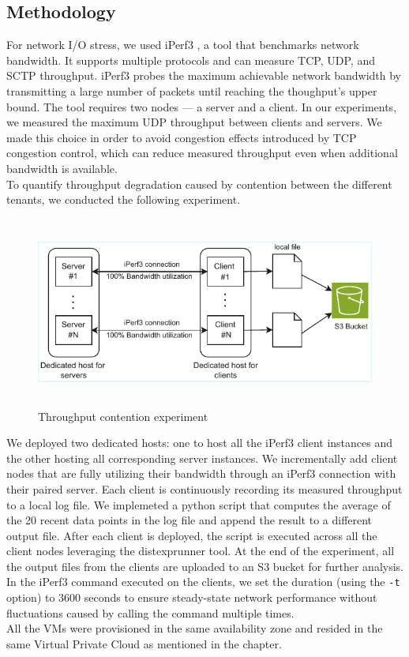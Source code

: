 \subsection{Methodology}
For network I/O stress, we used iPerf3 \cite{iperf}, a tool that benchmarks network 
bandwidth. It supports multiple protocols and can measure TCP, UDP, and SCTP 
throughput. iPerf3 probes the maximum achievable network bandwidth by transmitting a large number 
of packets until reaching the thoughput's upper bound. The tool requires two nodes — a 
server and a client. In our experiments, we measured the 
maximum UDP throughput between clients and servers. We made this choice in order to avoid congestion 
effects introduced by TCP congestion control, which can reduce measured throughput even
when additional bandwidth is available. \\
To quantify throughput degradation caused by contention between the different tenants, 
we conducted the following experiment. 
\begin{figure}[H]
  \centering
  \includegraphics[width=14.5cm, height=6.25cm]{figures/netexp}
  \caption{Throughput contention experiment}
  \label{fig:netexp}
\end{figure}
\noindent
We deployed two dedicated hosts: one to host all the iPerf3 client instances and the other hosting all 
corresponding server instances.
We incrementally add client nodes that are fully utilizing their bandwidth 
through an iPerf3 connection with their paired server. Each client is continuously recording its measured 
throughput to a local log file. We implemeted a python script that computes the average of the 20 recent data 
points in the log file and append the result to a different output file. 
After each client is deployed, the script is executed across all the client nodes leveraging the distexprunner 
tool. At the end of the experiment, all the output files from the clients are uploaded to an S3 bucket 
for further analysis. \\
In the iPerf3 command executed on the clients, we set the duration (using the \texttt{-t} option) 
to 3600 seconds to ensure steady-state network performance without fluctuations caused by calling 
the command multiple times. \\
All the VMs were provisioned in the same availability zone and resided
in the same Virtual Private Cloud as mentioned in the  chapter. 
